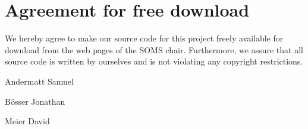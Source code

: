 \section*{Agreement for free download}
\bigskip

\bigskip

\large We hereby agree to make our source code for this project freely available for download from the web pages of the SOMS chair. Furthermore, we assure that all source code is written by ourselves and is not violating any copyright restrictions.

\begin{center}
\bigskip\bigskip\bigskip\bigskip\bigskip\bigskip\bigskip\bigskip\bigskip


\large Andermatt Samuel
\bigskip\bigskip\bigskip\bigskip\bigskip\bigskip\bigskip\bigskip\bigskip

\large B\"osser Jonathan
\bigskip\bigskip\bigskip\bigskip\bigskip\bigskip\bigskip\bigskip\bigskip

\large Meier David
\end{center}